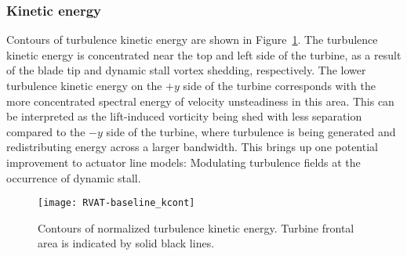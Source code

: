 \subsubsection{Kinetic energy}

Contours of turbulence kinetic energy are shown in
Figure~\ref{fig:RVAT-baseline-kcont}. The turbulence kinetic energy is
concentrated near the top and left side of the turbine, as a result of the blade
tip and dynamic stall vortex shedding, respectively. The lower turbulence
kinetic energy on the $+y$ side of the turbine corresponds with the more
concentrated spectral energy of velocity unsteadiness in this area. This can be
interpreted as the lift-induced vorticity being shed with less separation
compared to the $-y$ side of the turbine, where turbulence is being generated
and redistributing energy across a larger bandwidth. This brings up one
potential improvement to actuator line models: Modulating turbulence fields at
the occurrence of dynamic stall.

\begin{figure}
    \centering

    \texttt{[image: RVAT-baseline\_kcont]}

    \caption{Contours of normalized turbulence kinetic energy. Turbine frontal
        area is indicated by solid black lines.}
    
    \label{fig:RVAT-baseline-kcont}
\end{figure}

